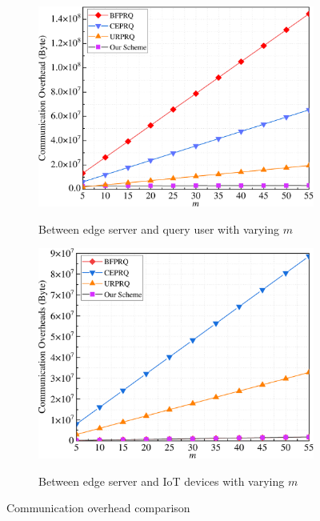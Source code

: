 \documentclass[IEEE JOURNAL OF BIOMEDICAL AND HEALTH INFORMATICS]{IEEEtran}
\begin{document}
\begin{figure}
\begin{subfigure}[t]{0.23\textwidth}
		\centering
		\includegraphics[width=1\textwidth]{commu_1m}\\
		\caption{Between edge server and query user with varying $m$}\label{commu_1m}	
	\end{subfigure}
	\quad
	\begin{subfigure}[t]{0.23\textwidth}
		\centering
		\includegraphics[width=1\textwidth]{commu_3m}\\
		\caption{Between edge server and IoT devices with varying $m$}\label{commu_3m}
	\end{subfigure}
	\caption{Communication overhead comparison}\label{communication}
\end{figure}
\end{document}
